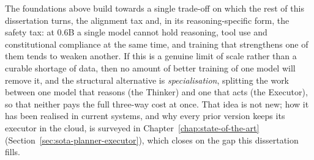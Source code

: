 The foundations above build towards a single trade-off on which the rest of this dissertation turns, the alignment tax and, in its reasoning-specific form, the safety tax: at 0.6B a single model cannot hold reasoning, tool use and constitutional compliance at the same time, and training that strengthens one of them tends to weaken another. If this is a genuine limit of scale rather than a curable shortage of data, then no amount of better training of one model will remove it, and the structural alternative is \emph{specialisation}, splitting the work between one model that reasons (the Thinker) and one that acts (the Executor), so that neither pays the full three-way cost at once. That idea is not new; how it has been realised in current systems, and why every prior version keeps its executor in the cloud, is surveyed in Chapter~\ref{chap:state-of-the-art} (Section~\ref{sec:sota-planner-executor}), which closes on the gap this dissertation fills.


